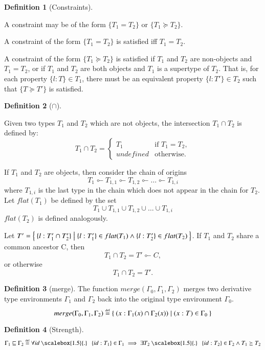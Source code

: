 \documentclass[a4paper]{article}
\theoremstyle{definition}
\newtheorem{definition}{Definition}[section]
\theoremstyle{dotless}
\newcommand*{\orig}{\ensuremath{\!\multimapinv\!}}
\newcommand\eqdef{\mathrel{\overset{\makebox[0pt]{\mbox{\normalfont\tiny def}}}{=}}}
\newcommand\qdot{\mathbin{\scalebox{1.5}{.}}\enspace}
\begin{document}
\begin{definition}[Constraints]\label{constraintsDefn}

  A constraint may be of the form $\{T_1 = T_2\}$ or $\{T_1 \succeq T_2\}$.

  A constraint of the form $\{T_1 = T_2\}$ is satisfied iff $T_1 = T_2$.

  A constraint of the form $\{T_1 \succeq T_2\}$ is satisfied if $T_1$ and
  $T_2$ are non-objects and $T_1 = T_2$, or if $T_1$ and $T_2$ are both
  objects and $T_1$ is a supertype of $T_2$. That is, for each property
  $\{l:T\} \in T_1$, there must be an equivalent property $\{l: T'\} \in T_2$ such
  that $\{T \succeq T'\}$ is satisfied.

\end{definition}

\begin{definition}[$\cap$]\label{typeIntersect}

  Given two types $T_1$ and $T_2$ which are not objects, the intersection $T_1\cap T_2$ is defined by:
  \begin{equation}\label{intersect-eqn}
  	T_1\cap T_2 = 
  	\begin{cases}
  	  T_1 & \text{if $T_1 = T_2$}, \\
  	  undefined & \text{otherwise.}
  	\end{cases}
  \end{equation}

  If $T_1$ and $T_2$ are objects, then consider the chain of origins $$T_1\orig
  T_{1,1}\orig T_{1,2}\orig \dots\orig T_{1,i}$$ where $T_{1,i}$ is the last
  type in the chain which does not appear in the chain for $T_2$.
  Let $flat(T_1)$ be defined by the set
  $$T_1 \cup T_{1,1} \cup T_{1,2} \cup \ldots \cup T_{1,i}$$
  $flat(T_2)$ is defined analogously.

  Let $T' = \Set{ \{l:T_1'\cap T_2'\} | \{l:T_1'\}\in flat(T_1) \land \{l:T_2'\}\in flat(T_2)}$.
  If $T_1$ and $T_2$ share a common ancestor C, then $$T_1\cap T_2 = T'\orig C,$$ or otherwise $$T_1\cap T_2 = T'.$$
  

\end{definition}

\begin{definition}[merge]\label{merge}
  The function $merge(\Gamma_0, \Gamma_1, \Gamma_2)$ merges two derivative type environments $\Gamma_1$ and $\Gamma_2$ back into the original type environment $\Gamma_0$.
  \begin{equation} \label{merge-eqn}
	merge (\Gamma_0, \Gamma_1, \Gamma_2) \eqdef \Set{ (x:\Gamma_1(x) \cap \Gamma_2(x)) | (x: T) \in \Gamma_0 }
  \end{equation}
\end{definition}

\begin{definition}[Strength]
  \begin{equation} \label{eqn:strength}
	\Gamma_1 \sqsubseteq \Gamma_2 \eqdef 
	\forall id\qdot \{id:T_1\}\in\Gamma_1 \implies \exists T_2 \qdot \{id:T_2\}\in\Gamma_2 \land T_1\succeq T_2
  \end{equation}
\end{definition}
\end{document}
